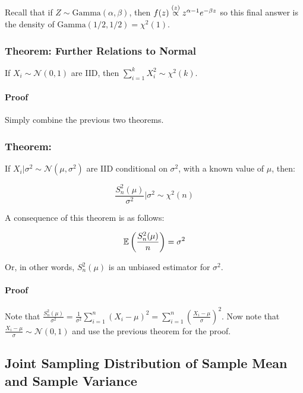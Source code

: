 \documentclass[a4paper]{article}
\begin{document}
                    Recall that if $Z \sim \text{Gamma}(\alpha, \beta)$, then
                    $f(z) \stackrel{({z})}{\propto} z^{\alpha - 1}e^{-\beta z}$ so this final
                    answer is the density of $\text{Gamma}(1/2, 1/2) =
                    \chi^2(1)$.

            \subsubsection{Theorem: Further Relations to Normal}
                If $X_i \sim \mathcal{N}(0, 1)$ are IID, then $\sum\limits_{i=1}
                ^k X_i^2 \sim \chi^2(k)$.

                \paragraph{Proof}
                    Simply combine the previous two theorems.

            \subsubsection{Theorem:}
                If $X_i | \sigma^2 \sim \mathcal{N}(\mu, \sigma^2)$ are IID
                conditional on $\sigma^2$, with a known value of $\mu$, then:

                \[
                    \frac{S_n^2(\mu)}{\sigma^2} | \sigma^2 \sim \chi^2(n)
                \]

                A consequence of this theorem is as follows:

                \[
                    \mathbb{E}\left(\frac{S_n^2(\mu)}{n}\right) = \sigma^2
                \]

                Or, in other words, $S_n^2(\mu)$ is an unbiased estimator for
                $\sigma^2$.

                \paragraph{Proof}
                    Note that $\frac{S_n^2(\mu)}{\sigma^2} = \frac{1}{\sigma^2}
                    \sum\limits_{i=1}^n (X_i - \mu)^2 = \sum\limits_{i=1}^n
                    \left(\frac{X_i - \mu}{\sigma}\right)^2$. Now note that
                    $\frac{X_i - \mu}{\sigma} \sim \mathcal{N}(0, 1)$ and use
                    the previous theorem for the proof.

        \subsection{Joint Sampling Distribution of Sample Mean and Sample
        Variance}
            \begin{fread}
                [DS12, section 8.3]
            \end{fread}
\end{document}
